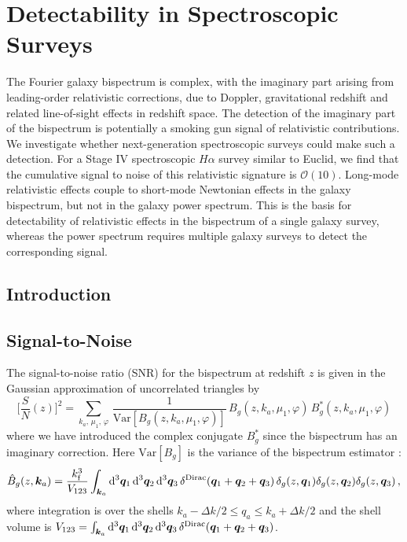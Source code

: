 \chapter{Detectability in Spectroscopic Surveys}
\label{chapter:snreuclid}
%
The Fourier galaxy bispectrum is complex, with the imaginary part arising from leading-order relativistic corrections, due to Doppler, gravitational redshift  and related line-of-sight effects  in redshift space. The detection of the imaginary  part of the bispectrum is potentially a smoking gun signal of relativistic contributions.  We investigate whether next-generation spectroscopic surveys could make such a detection. For a Stage IV spectroscopic $H\alpha$ survey similar to Euclid, we find that  the cumulative signal to noise of this relativistic signature  is $\mathcal{O}(10)$. 
{Long-mode relativistic effects couple to  short-mode Newtonian effects in the galaxy bispectrum, but not in the galaxy power spectrum.
This is  the basis for detectability of relativistic effects in the bispectrum of a single galaxy survey, whereas the power spectrum requires multiple galaxy surveys to detect the corresponding signal.}
%
%
%
%
\section{Introduction}
%
%
%
%
%
\section{Signal-to-Noise}
%
The signal-to-noise ratio (SNR) for the bispectrum  at redshift $z$ is given in the Gaussian approximation of uncorrelated triangles by \cite{Scoccimarro:2003wn}
\begin{equation}
\bigg[\frac{S}{N}(z)\bigg]^{2} = 
\sum_{k_a,\,\mu_{1},\,\varphi}\,\frac{1}{{\mathrm{Var}} [{B_{g}}(z, k_a,\mu_{1},\varphi)]}
\,B_{g}(z, k_{a},  \mu_{1},\varphi)\,B^*_{g}(z, k_a, \mu_{1},\varphi)
\end{equation} 
where we have introduced the complex conjugate $B^*_{g}$ since the bispectrum  has an imaginary correction. {Here ${\mathrm{Var}} [{B_{g}}]$ is the variance  of the bispectrum estimator
 \cite{Chan:2016ehg}:
\begin{equation} 
\hat{B}_g(z,\bm{k}_a) = \frac{k_{\mathrm{f}}^3}{V_{123}}\int_{\bm{k}_a}\mathrm{d}^3\bm{q}_1\, \mathrm{d}^3\bm{q}_2 \,\mathrm{d}^3\bm{q}_3\,\delta^{{\mathrm{Dirac}}}(\bm{q}_1+\bm{q}_2+\bm{q}_3)\, \delta_g(z,\bm{q}_1) \delta_g(z,\bm{q}_2) \delta_g(z,\bm{q}_3) \,,
\end{equation}
where integration is over the shells $k_a-\Delta k/2\leq q_a \leq k_a+\Delta k/2$ and  the shell volume is
$V_{123}=\int_{\bm{k}_a}\mathrm{d}^3\bm{q}_1\, \mathrm{d}^3\bm{q}_2 \,\mathrm{d}^3\bm{q}_3\,\delta^{{\mathrm{Dirac}}}(\bm{q}_1+\bm{q}_2+\bm{q}_3)$.}


